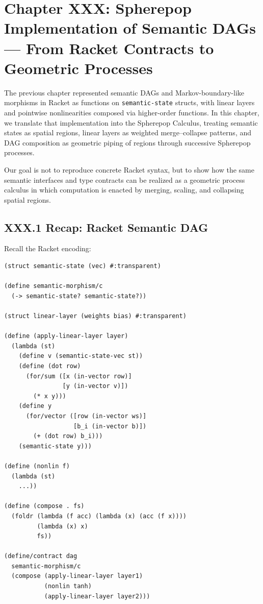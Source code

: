 \documentclass[11pt,letterpaper]{article}
\begin{document}
\newpage

\section{Chapter XXX: Spherepop Implementation of Semantic DAGs —  
From Racket Contracts to Geometric Processes}

The previous chapter represented semantic DAGs and Markov-boundary-like morphisms in Racket as functions on \texttt{semantic-state} structs, with linear layers and pointwise nonlinearities composed via higher-order functions. In this chapter, we translate that implementation into the Spherepop Calculus, treating semantic states as spatial regions, linear layers as weighted merge--collapse patterns, and DAG composition as geometric piping of regions through successive Spherepop processes.

Our goal is not to reproduce concrete Racket syntax, but to show how the same semantic interfaces and type contracts can be realized as a geometric process calculus in which computation is enacted by merging, scaling, and collapsing spatial regions.

\subsection{XXX.1 Recap: Racket Semantic DAG}

Recall the Racket encoding:

\begin{verbatim}
(struct semantic-state (vec) #:transparent)

(define semantic-morphism/c
  (-> semantic-state? semantic-state?))

(struct linear-layer (weights bias) #:transparent)

(define (apply-linear-layer layer)
  (lambda (st)
    (define v (semantic-state-vec st))
    (define (dot row)
      (for/sum ([x (in-vector row)]
                [y (in-vector v)])
        (* x y)))
    (define y
      (for/vector ([row (in-vector ws)]
                   [b_i (in-vector b)])
        (+ (dot row) b_i)))
    (semantic-state y)))

(define (nonlin f)
  (lambda (st)
    ...))

(define (compose . fs)
  (foldr (lambda (f acc) (lambda (x) (acc (f x))))
         (lambda (x) x)
         fs))

(define/contract dag
  semantic-morphism/c
  (compose (apply-linear-layer layer1)
           (nonlin tanh)
           (apply-linear-layer layer2)))
\end{verbatim}
\end{document}
